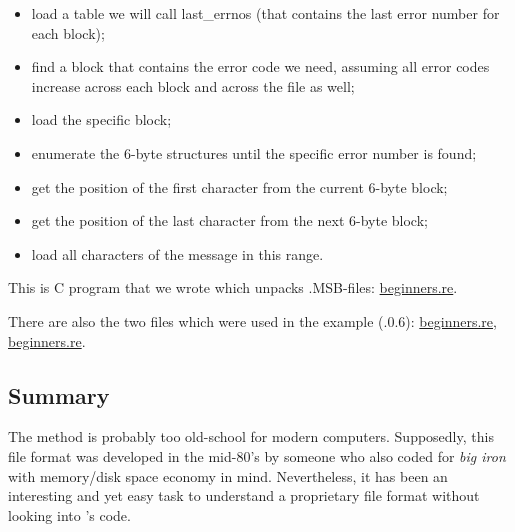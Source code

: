 \begin{itemize}
\item load a table we will call last\_errnos (that contains the last error number for each block);

\item find a block that contains the error code we need, assuming all error codes 
increase across each block and across the file as well;

\item load the specific block;

\item enumerate the 6-byte structures until the specific error number is found;

\item get the position of the first character from the current 6-byte block;

\item get the position of the last character from the next 6-byte block;

\item load all characters of the message in this range.
\end{itemize}

This is C program that we wrote which unpacks .MSB-files:
\href{http://beginners.re/examples/oracle/MSB/oracle_msb.c}{beginners.re}.

There are also the two files which were used in the example 
(.0.6):
\href{http://beginners.re/examples/oracle/MSB/oraus.msb}{beginners.re},
\href{http://beginners.re/examples/oracle/MSB/oraus.msg}{beginners.re}.

\subsection{Summary}

The method is probably too 
old-school for modern computers.
Supposedly, this file format was developed in the mid-80's by 
someone who also coded for \emph{big iron} with
memory/disk space economy in mind.
Nevertheless, it has been an interesting and yet easy task 
to understand a proprietary file format without looking into \oracle's code.
